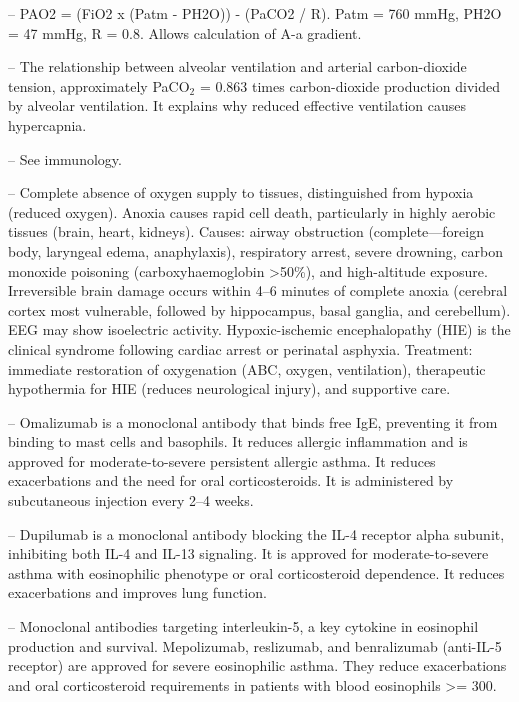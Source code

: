 -- PAO2 = (FiO2 x (Patm - PH2O)) - (PaCO2 / R). Patm = 760 mmHg, PH2O = 47 mmHg, R = 0.8. Allows calculation of A-a gradient.

-- The relationship between alveolar ventilation and arterial carbon-dioxide tension, approximately PaCO$_2$ = 0.863 times carbon-dioxide production divided by alveolar ventilation. It explains why reduced effective ventilation causes hypercapnia.

-- See immunology.

-- Complete absence of oxygen supply to tissues, distinguished from hypoxia (reduced oxygen). Anoxia causes rapid cell death, particularly in highly aerobic tissues (brain, heart, kidneys). Causes: airway obstruction (complete—foreign body, laryngeal edema, anaphylaxis), respiratory arrest, severe drowning, carbon monoxide poisoning (carboxyhaemoglobin >50\%), and high-altitude exposure. Irreversible brain damage occurs within 4--6 minutes of complete anoxia (cerebral cortex most vulnerable, followed by hippocampus, basal ganglia, and cerebellum). EEG may show isoelectric activity. Hypoxic-ischemic encephalopathy (HIE) is the clinical syndrome following cardiac arrest or perinatal asphyxia. Treatment: immediate restoration of oxygenation (ABC, oxygen, ventilation), therapeutic hypothermia for HIE (reduces neurological injury), and supportive care.

-- Omalizumab is a monoclonal antibody that binds free IgE, preventing it from binding to mast cells and basophils. It reduces allergic inflammation and is approved for moderate-to-severe persistent allergic asthma. It reduces exacerbations and the need for oral corticosteroids. It is administered by subcutaneous injection every 2--4 weeks.

-- Dupilumab is a monoclonal antibody blocking the IL-4 receptor alpha subunit, inhibiting both IL-4 and IL-13 signaling. It is approved for moderate-to-severe asthma with eosinophilic phenotype or oral corticosteroid dependence. It reduces exacerbations and improves lung function.

-- Monoclonal antibodies targeting interleukin-5, a key cytokine in eosinophil production and survival. Mepolizumab, reslizumab, and benralizumab (anti-IL-5 receptor) are approved for severe eosinophilic asthma. They reduce exacerbations and oral corticosteroid requirements in patients with blood eosinophils >= 300.

